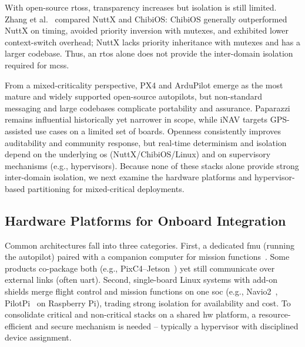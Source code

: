 With open-source \glspl{rtos}, transparency increases but isolation is still limited.
Zhang et al.~\cite{zhang2021best} compared NuttX and ChibiOS: ChibiOS generally
outperformed NuttX on timing, avoided priority inversion with mutexes, and
exhibited lower context-switch overhead; NuttX lacks priority inheritance with
mutexes and has a larger codebase.
Thus, an \gls{rtos} alone does not provide the inter-domain isolation required for \glspl{mcs}.

From a mixed-criticality perspective, PX4 and ArduPilot emerge as the most
mature and widely supported open-source autopilots, but non-standard messaging and large codebases
complicate portability and assurance. Paparazzi remains influential historically
yet narrower in scope, while iNAV targets GPS-assisted use cases on a limited
set of boards. Openness consistently improves auditability and community
response, but real-time determinism and isolation depend on the underlying \gls{os}
(NuttX/ChibiOS/Linux) and on supervisory mechanisms (e.g., hypervisors).
Because none of these stacks alone provide strong inter-domain isolation, we
next examine the hardware platforms and hypervisor-based partitioning for mixed-critical deployments.

\subsection{Hardware Platforms for Onboard Integration}
\label{subsec:rw-hw-context}
Common architectures fall into three categories.
First, a dedicated \gls{fmu} (running the autopilot) paired with a companion
computer for mission functions~\cite{pixhawk4,arduPilot-cuavV5}. Some products
co-package both (e.g., PixC4–Jetson~\cite{jetson-docs}) yet still communicate
over external links (often \gls{uart}).
%
Second, single-board Linux systems with add-on shields merge flight control and
mission functions on one \gls{soc} (e.g., Navio2~\cite{navio2-px4},
PilotPi~\cite{px4-pilotpi} on Raspberry Pi), trading strong isolation for
availability and cost. To consolidate critical and non-critical stacks on a
shared \gls{hw} platform, a resource-efficient and secure mechanism is
needed -- typically a hypervisor with disciplined device assignment.

